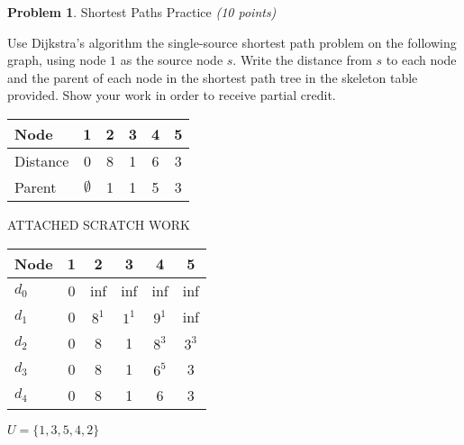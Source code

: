 \documentclass[11pt]{article}
\theoremstyle{definition}
\theoremstyle{theorem}
\newtheorem{prob}{Problem}
\newcommand{\solution}{\medskip\noindent{\color{DarkBlue}\textbf{Solution:}}}
\begin{document}
\newpage

\begin{prob} Shortest Paths Practice  \emph{(10 points)} \end{prob}

Use Dijkstra's algorithm the single-source shortest path problem on the following graph, using node $1$ as the source node $s$.  Write the distance from $s$ to each node and the parent of each node in the shortest path tree in the skeleton table provided. Show your work in order to receive partial credit.

\vspace{15pt}
\begin{figure}[h!]
\begin{center}
\end{center}
\end{figure}

\vspace{15pt}
\solution
\vspace{15pt}

\begin{center}
\begin{tabular}{|l|c|c|c|c|c|}
\hline
Node & 1 & 2 & 3 & 4 & 5 \\
\hline
Distance & 0 & 8 & 1 & 6 & 3  \\
Parent   & $\emptyset$ & 1 & 1 & 5 & 3 \\
\hline
\end{tabular}
\end{center}

ATTACHED SCRATCH WORK

\begin{center}
\begin{tabular}{|l|c|c|c|c|c|}
\hline
Node & 1 & 2 & 3 & 4 & 5 \\
\hline
$d_0$ & 0 & inf & inf & inf & inf \\
$d_1$ & 0 & $8^1$ & $1^1$ & $9^1$ & inf\\
$d_2$ & 0 & 8 & 1 & $8^3$ & $3^3$ \\
$d_3$ & 0 & 8 & 1 & $6^5$ & 3 \\
$d_4$ & 0 & 8 & 1 & 6 & 3 \\
\hline
\end{tabular}
$U = \{1, 3, 5, 4, 2\}$
\end{center}
\end{document}
